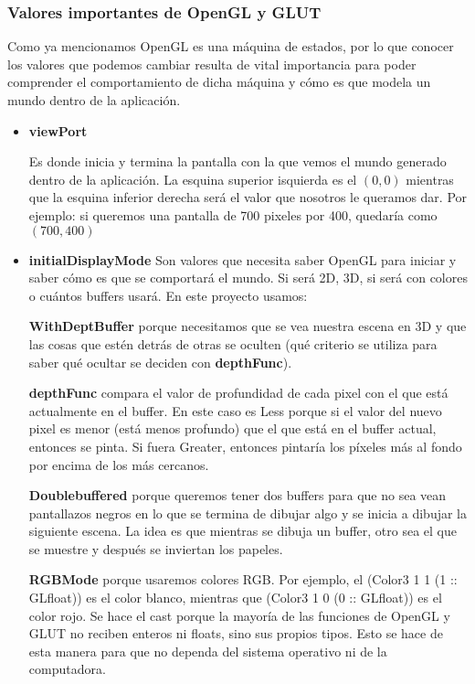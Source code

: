 \documentclass{article}
\begin{document}
\subsubsection{Valores importantes de OpenGL y GLUT}
Como ya mencionamos OpenGL es una máquina de estados, por lo que conocer los valores que podemos cambiar resulta de vital importancia para poder comprender el comportamiento de dicha máquina y cómo es que modela un mundo dentro de la aplicación.

\begin{itemize}

    \item \textbf{viewPort}
    
    Es donde inicia y termina la pantalla con la que vemos el mundo generado dentro de la aplicación. La esquina superior isquierda es el $(0,0)$ mientras que la esquina inferior derecha será el valor que nosotros le queramos dar. Por ejemplo: si queremos una pantalla de 700 pixeles por 400, quedaría como $(700,400)$
    
    
    \item \textbf{initialDisplayMode}
    Son valores que necesita saber OpenGL para iniciar y saber cómo es que se comportará el mundo. Si será 2D, 3D, si será con colores o cuántos buffers usará.
    En este proyecto usamos:
    
    \textbf{WithDeptBuffer} porque necesitamos que se vea nuestra escena en 3D y que las cosas que estén detrás de otras se oculten (qué criterio se utiliza para saber qué ocultar se deciden con \textbf{depthFunc}). 
    
    \textbf{depthFunc} compara el valor de profundidad de cada pixel con el que está actualmente en el buffer. En este caso es Less porque si el valor del nuevo pixel es menor (está menos profundo) que el que está en el buffer actual, entonces se pinta. Si fuera Greater, entonces pintaría los píxeles más al fondo por encima de los más cercanos.
    
    \textbf{Doublebuffered} porque queremos tener dos buffers para que no sea vean pantallazos negros en lo que se termina de dibujar algo y se inicia a dibujar la siguiente escena. 
    La idea es que mientras se dibuja un buffer, otro sea el que se muestre y después se inviertan los papeles.
    
    \textbf{RGBMode} porque usaremos colores RGB. Por ejemplo, el (Color3 1 1 (1 :: GLfloat)) es el color blanco, mientras que (Color3 1 0 (0 :: GLfloat)) es el color rojo. Se hace el cast porque la mayoría de las funciones de OpenGL y GLUT no reciben enteros ni floats, sino sus propios tipos. Esto se hace de esta manera para que no dependa del sistema operativo ni de la computadora.
    

\end{itemize}
\end{document}
